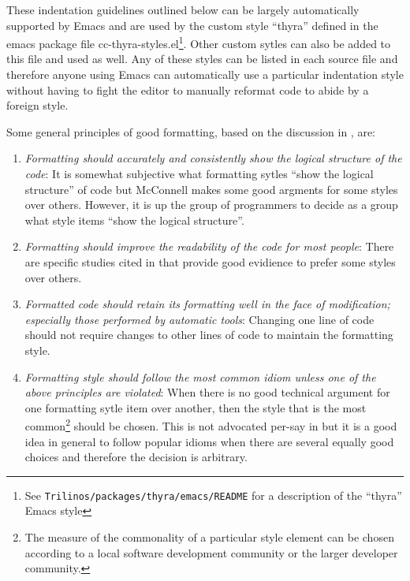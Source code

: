 These indentation guidelines outlined below can be largely automatically
supported by Emacs and are used by the custom style ``thyra'' defined in the
emacs package file cc-thyra-styles.el\footnote{See
{}\texttt{Trilinos/packages/thyra/emacs/README} for a description of the
``thyra'' Emacs style}.  Other custom sytles can also be added to this file
and used as well.  Any of these styles can be listed in each source file and
therefore anyone using Emacs can automatically use a particular indentation
style without having to fight the editor to manually reformat code to abide by
a foreign style.

Some general principles of good formatting, based on the discussion in
{}\cite[Section 31.1]{CodeComplete2nd04}, are:

\begin{enumerate}

{}\item\textit{Formatting should accurately and consistently show the logical
structure of the code}: It is somewhat subjective what formatting sytles
``show the logical structure'' of code but McConnell makes some good argments
for some styles over others.  However, it is up the group of programmers to
decide as a group what style items ``show the logical structure''.

{}\item\textit{Formatting should improve the readability of the code for most
people}: There are specific studies cited in {}\cite[Chapter
31]{CodeComplete2nd04} that provide good evidience to prefer some styles over
others.

{}\item\textit{Formatted code should retain its formatting well in the face of
modification; especially those performed by automatic tools}: Changing one
line of code should not require changes to other lines of code to maintain the
formatting style.

{}\item\textit{Formatting style should follow the most common idiom unless one
of the above principles are violated}: When there is no good technical
argument for one formatting sytle item over another, then the style that is
the most common\footnote{The measure of the commonality of a particular style
element can be chosen according to a local software development community or
the larger developer community.} should be chosen.  This is not advocated
per-say in {}\cite[Chapter 31]{CodeComplete2nd04} but it is a good idea in
general to follow popular idioms when there are several equally good choices
and therefore the decision is arbitrary.

\end{enumerate}

